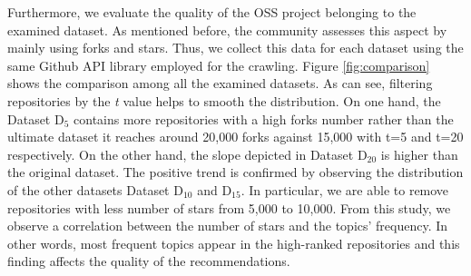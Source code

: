  
Furthermore, we evaluate the quality of the OSS project belonging to the examined dataset. As mentioned before, the \GH community assesses this aspect by mainly using forks and stars. Thus, we collect this data for each dataset using the same Github API library employed for the crawling. Figure \ref{fig:comparison} shows the comparison among all the examined datasets. As can see, filtering repositories by the \emph{t} value helps to smooth the distribution. On one hand, the Dataset D$_5$ contains more repositories with a high forks number rather than the ultimate dataset \ie it reaches around 20,000 forks against 15,000 with t=5 and t=20 respectively. On the other hand, the slope depicted in Dataset D$_{20}$ is higher than the original dataset. The positive trend is confirmed by observing the distribution of the other datasets \ie Dataset D$_{10}$ and D$_{15}$. In particular, we are able to remove repositories with less number of stars \ie from 5,000 to 10,000. 
From this study, we observe a correlation between the number of stars and the topics' frequency. In other words, most frequent topics appear in the high-ranked repositories and this finding affects the quality of the recommendations. 







